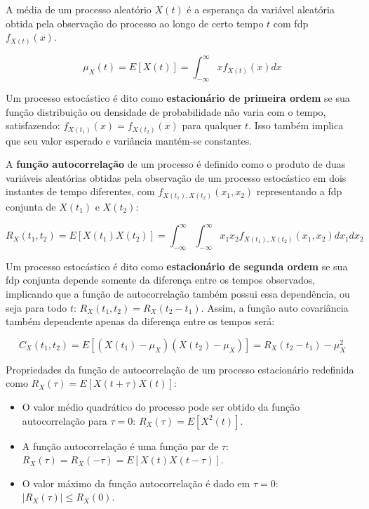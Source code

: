 A média de um processo aleatório $X(t)$ é a esperança da variável aleatória obtida pela observação do processo ao longo de certo tempo $t$ com fdp $f_{X(t)}(x)$.

\begin{equation} \label{haykin:1}
\mu_X(t) = E[X(t)] = \int_{-\infty}^{\infty} xf_{X(t)}(x)dx
\end{equation}

Um processo estocástico é dito como \textbf{estacionário de primeira ordem} se sua função distribuição ou densidade de probabilidade não varia com o tempo, satisfazendo: $f_{X(t_1)}(x) = f_{X(t_2)}(x)$ para qualquer $t$. Isso também implica que seu valor esperado e variância mantém-se constantes.

A \textbf{função autocorrelação} de um processo é definido como o produto de duas variáveis aleatórias obtidas pela observação de um processo estocástico em dois instantes de tempo diferentes, com $f_{X(t_1),X(t_2)}(x_1,x_2)$ representando a fdp conjunta de $X(t_1)$ e $X(t_2)$:

\begin{equation} \label{haykin:2}
R_X(t_1,t_2) = E[X(t_1)X(t_2)] =  \int_{-\infty}^{\infty}  \int_{-\infty}^{\infty} x_1x_2 f_{X(t_1),X(t_2)}(x_1,x_2)dx_1dx_2
\end{equation}

Um processo estocástico é dito como \textbf{estacionário de segunda ordem} se sua fdp conjunta depende somente da diferença entre os tempos observados, implicando que a função de autocorrelação também possui essa dependência, ou seja para todo $t$: $R_X(t_1,t_2) = R_X(t_2-t_1)$. Assim, a função auto covariância também dependente apenas da diferença entre os tempos será:

\begin{equation} \label{haykin:3}
C_X(t_1,t_2) = E[(X(t_1)-\mu_X)(X(t_2)-\mu_X)] = R_X(t_2-t_1) - \mu_X^2
\end{equation}

Propriedades da função de autocorrelação de um processo estacionário redefinida como $R_X(\tau) = E[X(t+\tau)X(t)]$:

\begin{itemize}
    \item O valor médio quadrático do processo pode ser obtido da função autocorrelação para $\tau=0$: $R_X(\tau) = E[X^2(t)]$.
    
    \item A função autocorrelação é uma função par de $\tau$: $R_X(\tau) = R_X(-\tau) = E[X(t)X(t-\tau)]$.
    
    \item O valor máximo da função autocorrelação é dado em $\tau=0$: $|R_X(\tau)| \leq R_X(0)$.
\end{itemize}

